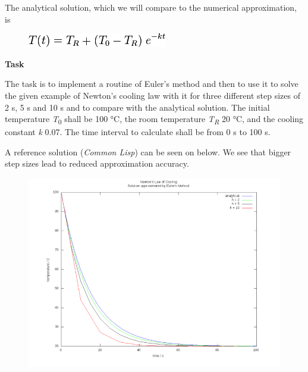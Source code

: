 The analytical solution, which we will compare to the numerical
approximation, is

\begin{figure}[H]
\centering
\includegraphics[scale=.6]{graphics/35fc97d739522cf3dc29d28cabc2e717.png}
\end{figure}

\textbf{Task}

The task is to implement a routine of Euler's method and then to use it
to solve the given example of Newton's cooling law with it for three
different step sizes of 2 s, 5 s and 10 s and to compare with the
analytical solution. The initial temperature \emph{T}\textsubscript{0}
shall be 100 °C, the room temperature \emph{T}\textsubscript{\emph{R}}
20 °C, and the cooling constant \emph{k} 0.07. The time interval to
calculate shall be from 0 s to 100 s.

A reference solution (\emph{Common Lisp}) can be seen on below. We see
that bigger step sizes lead to reduced approximation accuracy.

\begin{figure}[H]
\centering
\includegraphics[scale=.6]{graphics/750px-Euler_Method_Newton_Cooling.png}
\end{figure}


